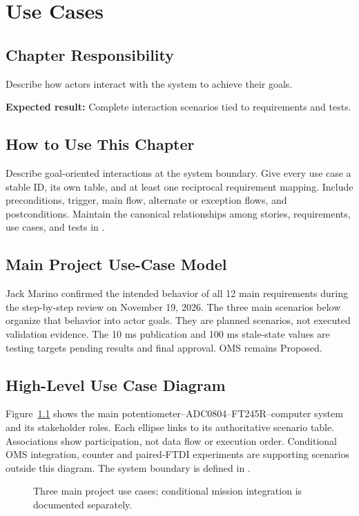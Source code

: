 \chapter{Use Cases}
\section{Chapter Responsibility}
\label{Section:UseCasesResponsibility}
Describe how actors interact with the system to achieve their goals.

\noindent\textbf{Expected result:} Complete interaction scenarios tied to requirements and tests.

\section{How to Use This Chapter}
Describe goal-oriented interactions at the system boundary. Give every use case
a stable ID, its own table, and at least one reciprocal requirement mapping.
Include preconditions, trigger, main flow, alternate or exception flows, and
postconditions. Maintain the canonical relationships among stories,
requirements, use cases, and tests in .

\section{Main Project Use-Case Model}
\label{Section:WeekTwoUseCases}
Jack Marino confirmed the intended behavior of all 12 main requirements during the step-by-step review on November 19, 2026. The three main scenarios below organize that behavior into actor goals. They are planned scenarios, not executed validation evidence. The 10 ms publication and 100 ms stale-state values are testing targets pending results and final approval. OMS remains Proposed.

\section[High-Level Use Case Diagram]{High-Level Use Case Diagram}
Figure~\ref{Figure:UseCaseDiagram} shows the main potentiometer--ADC0804--FT245R--computer system and its stakeholder roles. Each ellipse links to its authoritative scenario table. Associations show participation, not data flow or execution order. Conditional OMS integration, counter and paired-FTDI experiments are supporting scenarios outside this diagram. The system boundary is defined in .
\begin{figure}[htbp]
\centering

\caption{Three main project use cases; conditional mission integration is documented separately.}
\label{Figure:UseCaseDiagram}
\end{figure}
